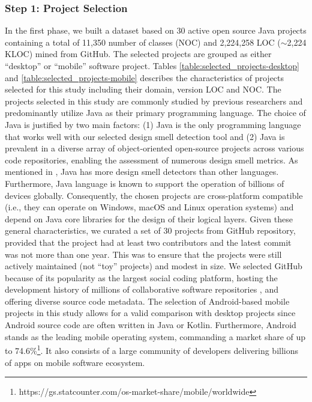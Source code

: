 \documentclass[AMA,Times1COL]{WileyNJDv5} %
\begin{document}
\subsubsection*{Step 1: Project Selection}
In the first phase, we built a dataset based on 30 active open source  Java projects containing a total of 11,350 number of classes (NOC) and 2,224,258 LOC ($\sim$2,224 KLOC) mined from GitHub. The selected projects are grouped as either ``desktop'' or ``mobile'' software project. Tables \ref{table:selected_projects-desktop} and \ref{table:selected_projects-mobile} describes the characteristics of projects selected for this study including their domain, version LOC and NOC. The projects selected in this study are commonly studied by previous researchers and predominantly utilize Java as their primary programming language. The choice of Java is justified by two main factors: (1) Java is the only programming language that works well with our  selected design smell detection tool and (2) Java is prevalent in a diverse array of object-oriented open-source projects across various code repositories, enabling the assessment of numerous design smell metrics. As mentioned in \cite{mannan2016understanding}, Java has more design smell detectors than other languages. Furthermore, Java language is known to support the operation of billions of devices globally. Consequently, the chosen projects are cross-platform compatible (i.e., they can operate on Windows, macOS and Linux operation systems) and depend on Java core libraries for the design of their logical layers. Given these general characteristics, we curated a set of 30 projects from GitHub repository, provided that the project had at least two contributors and the latest commit was not more than one year. This was to ensure that the projects were still actively maintained (not ``toy'' projects) and modest in size. We selected GitHub because of its popularity as the largest social coding platform, hosting the development history of millions of collaborative software repositories \cite{decan2022use}, and  offering diverse source code metadata.
The selection of Android-based mobile projects in this study allows for a valid comparison with desktop projects since Android source code are often written in Java or Kotlin. Furthermore, Android stands as the leading mobile operating system, commanding a market share of up to 74.6\%\footnote{https://gs.statcounter.com/os-market-share/mobile/worldwide}. It also consists of a large community of developers delivering billions of apps on mobile software ecosystem.
\end{document}
